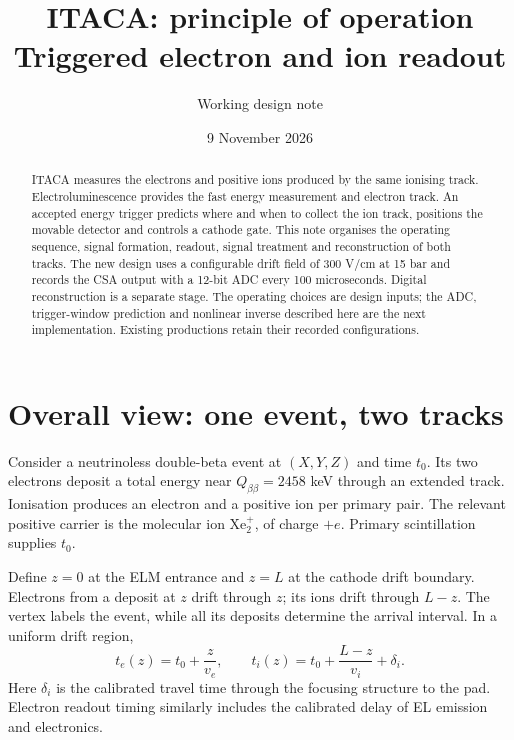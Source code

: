\documentclass[11pt,a4paper]{article}
\title{ITACA: principle of operation\\Triggered electron and ion readout}
\author{Working design note}
\date{9 November 2026}
\newcommand{\Qbb}{Q_{\beta\beta}}
\begin{document}
\maketitle
\begin{abstract}
ITACA measures the electrons and positive ions produced by the same ionising
track. Electroluminescence provides the fast energy measurement and electron
track. An accepted energy trigger predicts where and when to collect the ion
track, positions the movable detector and controls a cathode gate. This note
organises the operating sequence, signal formation, readout, signal treatment
and reconstruction of both tracks. The new design uses a configurable drift
field of 300 V/cm at 15 bar and records the CSA output with a 12-bit ADC every
100 microseconds. Digital reconstruction is a separate stage. The operating
choices are design inputs; the ADC, trigger-window prediction and nonlinear
inverse described here are the next implementation. Existing productions
retain their recorded configurations.
\end{abstract}
\tableofcontents

\section{Overall view: one event, two tracks}
\label{sec:overview}
Consider a neutrinoless double-beta event at $(X,Y,Z)$ and time $t_0$.
Its two electrons deposit a total energy near $\Qbb=2458$ keV through an
extended track. Ionisation produces an electron and a positive ion per primary
pair. The relevant positive carrier is the molecular ion $\mathrm{Xe}_2^+$,
of charge $+e$. Primary scintillation supplies $t_0$.

Define $z=0$ at the ELM entrance and $z=L$ at the cathode drift boundary.
Electrons from a deposit at $z$ drift through $z$; its ions drift through
$L-z$. The vertex labels the event, while all its deposits determine the
arrival interval. In a uniform drift region,
\begin{equation}
 t_e(z)=t_0+\frac{z}{v_e},\qquad
 t_i(z)=t_0+\frac{L-z}{v_i}+\delta_i.
 \label{eq:times}
\end{equation}
Here $\delta_i$ is the calibrated travel time through the focusing structure
to the pad. Electron readout timing similarly includes the calibrated delay
of EL emission and electronics.
\end{document}
